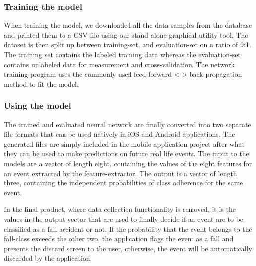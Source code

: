 \documentclass[12pt, a4paper, onecolumn]{article}
\begin{document}
		\subsubsection{Training the model}
			When training the model, we downloaded all the data samples from the database and printed them to a CSV-file using our stand alone graphical utility tool. The dataset is then split up between training-set, and evaluation-set on a ratio of 9:1. The training set contains the labeled training data whereas the evaluation-set contains unlabeled data for measurement and cross-validation. The network training program uses the commonly used feed-forward <-> back-propagation method \cite{neural_networks} to fit the model. 

		
		\subsubsection{Using the model}
			The trained and evaluated neural network are finally converted into two separate file formats that can be used natively in iOS and Android applications. The generated files are simply included in the mobile application project after what they can be used to make predictions on future real life events. The input to the models are a vector of length eight, containing the values of the eight features for an event extracted by the feature-extractor. The output is a vector of length three, containing the independent probabilities of class adherence for the same event. 
			
			In the final product, where data collection functionality is removed, it is the values in the output vector that are used to finally decide if an event are to be classified as a fall accident or not. If the probability that the event belongs to the fall-class exceeds the other two, the application flags the event as a fall and presents the discard screen to the user, otherwise, the event will be automatically discarded by the application. 



\end{document}
